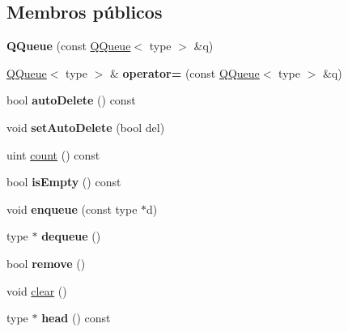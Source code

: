 \subsection*{Membros públicos}
\begin{DoxyCompactItemize}
\item 
\hypertarget{class_q_queue_ae3fe5fc5141d48e0c6c3dbd58743c486}{{\bfseries Q\-Queue} (const \hyperlink{class_q_queue}{Q\-Queue}$<$ type $>$ \&q)}\label{class_q_queue_ae3fe5fc5141d48e0c6c3dbd58743c486}

\item 
\hypertarget{class_q_queue_ab96765a191198697bc6a8d66de83d268}{\hyperlink{class_q_queue}{Q\-Queue}$<$ type $>$ \& {\bfseries operator=} (const \hyperlink{class_q_queue}{Q\-Queue}$<$ type $>$ \&q)}\label{class_q_queue_ab96765a191198697bc6a8d66de83d268}

\item 
\hypertarget{class_q_queue_a64c0f7f7f99c10922f570668b10acb2f}{bool {\bfseries auto\-Delete} () const }\label{class_q_queue_a64c0f7f7f99c10922f570668b10acb2f}

\item 
\hypertarget{class_q_queue_a670b4fe1fa9d29712524460f21ccdce0}{void {\bfseries set\-Auto\-Delete} (bool del)}\label{class_q_queue_a670b4fe1fa9d29712524460f21ccdce0}

\item 
uint \hyperlink{class_q_queue_a774149fc271ebaba2aabcd183a836e8f}{count} () const 
\item 
\hypertarget{class_q_queue_a479432127ee77145cc19d6a2d1590821}{bool {\bfseries is\-Empty} () const }\label{class_q_queue_a479432127ee77145cc19d6a2d1590821}

\item 
\hypertarget{class_q_queue_a85d5214fb44bb1dd48d6cf0b971b7d52}{void {\bfseries enqueue} (const type $\ast$d)}\label{class_q_queue_a85d5214fb44bb1dd48d6cf0b971b7d52}

\item 
\hypertarget{class_q_queue_a4b03b385a3c733c38d07cbdcae519e79}{type $\ast$ {\bfseries dequeue} ()}\label{class_q_queue_a4b03b385a3c733c38d07cbdcae519e79}

\item 
\hypertarget{class_q_queue_a1f9c4a4bd47b7cd9beb431504c5ae46c}{bool {\bfseries remove} ()}\label{class_q_queue_a1f9c4a4bd47b7cd9beb431504c5ae46c}

\item 
void \hyperlink{class_q_queue_ac8bb3912a3ce86b15842e79d0b421204}{clear} ()
\item 
\hypertarget{class_q_queue_ab831581015e3c329757bcceaaf422409}{type $\ast$ {\bfseries head} () const }\label{class_q_queue_ab831581015e3c329757bcceaaf422409}


\end{DoxyCompactItemize}

